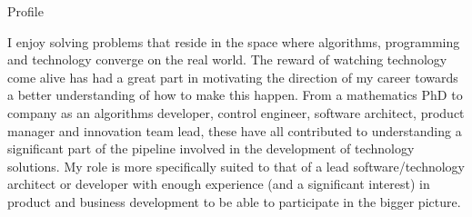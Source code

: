 \documentclass[a4paper,10pt]{article}
\begin{document}
\begin{cvsection}{Profile}
  \vspace{-1.5em}

  I enjoy solving problems that reside in the space where algorithms, programming and technology converge on the real world. The reward of watching technology come alive has had a great part in motivating the direction of my career towards a better understanding of how to make this happen. From a mathematics PhD to company as an algorithms developer, control engineer, software architect, product manager and innovation team lead, these have all contributed to understanding a significant part of the pipeline involved in the development of technology solutions. My role is more specifically suited to that of a lead software/technology architect or developer with enough experience (and a significant interest) in product and business development to be able to participate in the bigger picture.

\end{cvsection}
\end{document}
